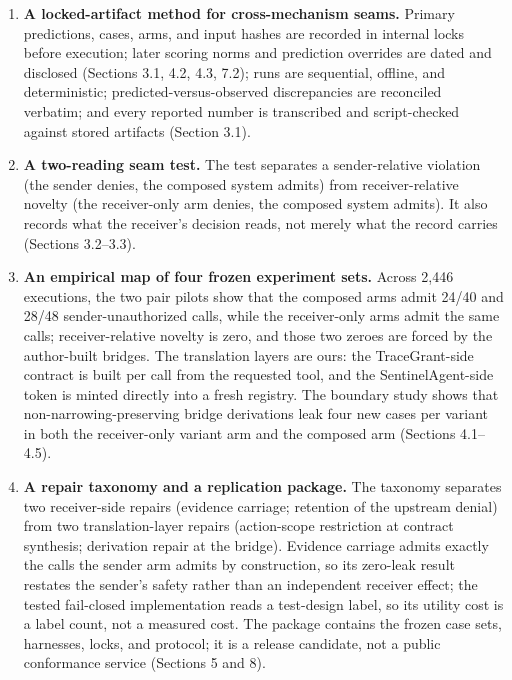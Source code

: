 \documentclass[
  10pt,
]{article}
\providecommand{\tightlist}{%
  \setlength{\itemsep}{0pt}\setlength{\parskip}{0pt}}
\renewcommand{\_}{\allowbreak\origunderscore}
\begin{document}
\begin{enumerate}
\def\labelenumi{\arabic{enumi}.}
\tightlist
\item
  \textbf{A locked-artifact method for cross-mechanism seams.} Primary
  predictions, cases, arms, and input hashes are recorded in internal
  locks before execution; later scoring norms and prediction overrides
  are dated and disclosed (Sections 3.1, 4.2, 4.3, 7.2); runs are
  sequential, offline, and deterministic; predicted-versus-observed
  discrepancies are reconciled verbatim; and every reported number is
  transcribed and script-checked against stored artifacts (Section 3.1).
\item
  \textbf{A two-reading seam test.} The test separates a sender-relative
  violation (the sender denies, the composed system admits) from
  receiver-relative novelty (the receiver-only arm denies, the composed
  system admits). It also records what the receiver's decision reads,
  not merely what the record carries (Sections 3.2--3.3).
\item
  \textbf{An empirical map of four frozen experiment sets.} Across 2,446
  executions, the two pair pilots show that the composed arms admit
  24/40 and 28/48 sender-unauthorized calls, while the receiver-only
  arms admit the same calls; receiver-relative novelty is zero, and
  those two zeroes are forced by the author-built bridges. The
  translation layers are ours: the TraceGrant-side contract is built per
  call from the requested tool, and the SentinelAgent-side token is
  minted directly into a fresh registry. The boundary study shows that
  non-narrowing-preserving bridge derivations leak four new cases per
  variant in both the receiver-only variant arm and the composed arm
  (Sections 4.1--4.5).
\item
  \textbf{A repair taxonomy and a replication package.} The taxonomy
  separates two receiver-side repairs (evidence carriage; retention of
  the upstream denial) from two translation-layer repairs (action-scope
  restriction at contract synthesis; derivation repair at the bridge).
  Evidence carriage admits exactly the calls the sender arm admits by
  construction, so its zero-leak result restates the sender's safety
  rather than an independent receiver effect; the tested fail-closed
  implementation reads a test-design label, so its utility cost is a
  label count, not a measured cost. The package contains the frozen case
  sets, harnesses, locks, and protocol; it is a release candidate, not a
  public conformance service (Sections 5 and 8).
\end{enumerate}
\end{document}
